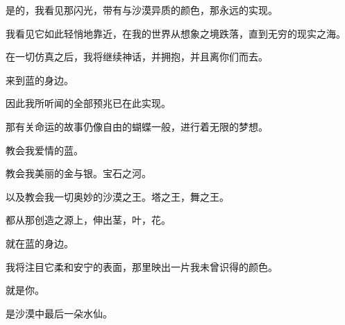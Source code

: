 \documentclass[UTF8]{article}
\begin{document}
\par 是的，我看见那闪光，带有与沙漠异质的颜色，那永远的实现。
\par 我看见它如此轻悄地靠近，在我的世界从想象之境跌落，直到无穷的现实之海。
\par 在一切仿真之后，我将继续神话，并拥抱，并且离你们而去。
\par 来到蓝的身边。
\\[0.6cm]
\par 因此我所听闻的全部预兆已在此实现。
\par 那有关命运的故事仍像自由的蝴蝶一般，进行着无限的梦想。
\par 教会我爱情的蓝。
\par 教会我美丽的金与银。宝石之河。
\par 以及教会我一切奥妙的沙漠之王。塔之王，舞之王。
\par 都从那创造之源上，伸出茎，叶，花。
\\[0.6cm]
\par 就在蓝的身边。
\par 我将注目它柔和安宁的表面，那里映出一片我未曾识得的颜色。
\par 就是你。
\par 是沙漠中最后一朵水仙。
\end{document}
